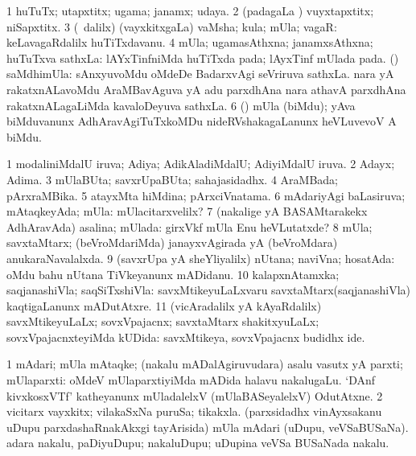 \bentry
{}
\gl{\nA}
\bmng
\bnum
\num{1} huTuTx; utapxtitx; ugama; janamx; udaya. 
\num{2} (padagaLa \vi) vuyxtapxtitx; niSapxtitx. 
\num{3} (\sA\ \bava dalilx) (vayxkitxgaLa) vaMsha; kula; mUla; vagaR:  keLavagaRdalilx huTiTxdavanu. 
\num{4} mUla; ugamasAthxna; janamxsAthxna; huTuTxva sathxLa:  lAYxTinfniMda huTiTxda pada; lAyxTinf mUlada pada. 
 (\aMrashA) saMdhimUla: 
\banum
{} sAnxyuvoMdu oMdeDe BadarxvAgi seVriruva sathxLa. 
 nara yA rakatxnALavoMdu AraMBavAguva yA adu parxdhAna nara athavA parxdhAna rakatxnALagaLiMda kavaloDeyuva sathxLa. 
\eanum
\numie
\num{6} (\ga) mUla (biMdu); yAva biMduvanunx AdhAravAgiTuTxkoMDu nideRVshakagaLanunx heVLuvevoV A biMdu. 
\enum
\emng
\eentry

\bentry
{}
\gl{\gu}
\bmng
\bnum
\num{1} modaliniMdalU iruva; Adiya; AdikAladiMdalU; AdiyiMdalU iruva. 
\num{2} Adayx; Adima. 
\num{3} mUlaBUta; savxrUpaBUta; sahajasidadhx. 
\num{4} AraMBada; pArxraMBika. 
\num{5} atayxMta hiMdina; pArxciVnatama. 
\num{6} mAdariyAgi baLasiruva; mAtaqkeyAda; mUla:  mUlacitarxvelilx? 
\num{7} (nakalige yA BASAMtarakekx AdhAravAda) asalina; mUlada:  girxVkf mUla Enu heVLutatxde? 
\num{8} mUla; savxtaMtarx; (beVroMdariMda) janayxvAgirada yA (beVroMdara) anukaraNavalalxda. 
\num{9} (savxrUpa yA sheYliyalilx) nUtana; naviVna; hosatAda:  oMdu bahu nUtana TiVkeyanunx mADidanu. 
\num{10} kalapxnAtamxka; saqjanashiVla; saqSiTxshiVla:  savxMtikeyuLaLxvaru savxtaMtarx(saqjanashiVla) kaqtigaLanunx mADutAtxre. 
\num{11} (vicAradalilx yA kAyaRdalilx) savxMtikeyuLaLx; sovxVpajacnx; savxtaMtarx shakitxyuLaLx; sovxVpajacnxteyiMda kUDida:  savxMtikeya, sovxVpajacnx budidhx ide. 
\enum
\emng
\eentry

\bentry
{}
\gl{\nA}
\bmng
\bnum
\num{1} mAdari; mUla mAtaqke; (nakalu mADalAgiruvudara) asalu vasutx yA parxti; mUlaparxti:  oMdeV mUlaparxtiyiMda mADida halavu nakalugaLu.  `DAnf kivxkosxVTf' katheyanunx mUladalelxV (mUlaBASeyalelxV) OdutAtxne. 
\num{2} vicitarx vayxkitx; vilakaSxNa puruSa; tikakxla. 
 (parxsidadhx vinAyxsakanu uDupu parxdashaRnakAkxgi tayArisida) 
\banum
{} mUla mAdari (uDupu, veVSaBUSaNa). 
 adara nakalu, paDiyuDupu; nakaluDupu; uDupina veVSa BUSaNada nakalu. 
\eanum
\numie
\enum
\emng
\eentry

